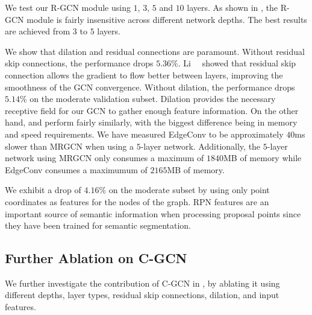 \documentclass[10pt,twocolumn,letterpaper]{article}
\begin{document}
We test our R-GCN module using $1$, $3$, $5$ and $10$ layers.
As shown in , the R-GCN module is fairly insensitive across different network depths.
The best results are achieved from $3$ to $5$ layers.



We show that dilation and residual connections are paramount.
Without residual skip connections, the performance drops $5.36\%$.
Li~\etal~\cite{li2019deepgcns_journal} showed that residual skip connection allows the gradient to flow better between layers, improving the smoothness of the GCN convergence.
Without dilation, the performance drops $5.14\%$ on the moderate validation subset.
Dilation provides the necessary receptive field for our GCN to gather enough feature information.
On the other hand, \MRGCN and \EdgeConv perform fairly similarly, with the biggest difference being in memory and speed requirements. 
We have measured EdgeConv to be approximately $40$ms slower than MRGCN when using a $5$-layer network.
Additionally, the $5$-layer network using MRGCN only consumes a maximum of $1840$MB of memory while EdgeConv consumes a maximumum of $2165$MB of memory. 



We exhibit a drop of $4.16\%$ on the moderate subset by using only point coordinates as features for the nodes of the graph.
RPN features are an important source of semantic information when processing proposal points since they have been trained for semantic segmentation.







\subsection{Further Ablation on C-GCN}

We further investigate the contribution of C-GCN in , by ablating it using different depths, layer types, residual skip connections, dilation, and input features.
\end{document}
